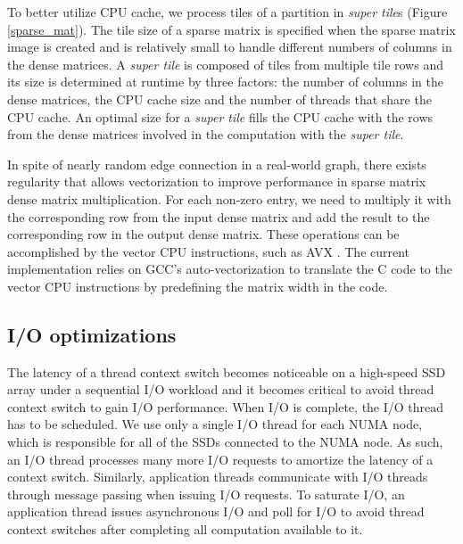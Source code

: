 To better utilize CPU cache, we process tiles of a partition in
\textit{super tile}s (Figure \ref{sparse_mat}). The tile size of a sparse
matrix is specified when the sparse matrix image is created and is relatively
small to handle different numbers of columns in the dense matrices.
A \textit{super tile} is composed of tiles from multiple tile rows and its
size is determined at runtime by three factors: the number of columns
in the dense matrices, the CPU cache size and the number of threads that
share the CPU cache. An optimal size for a \textit{super tile} fills
the CPU cache with the rows from the dense matrices involved in
the computation with the \textit{super tile}.

In spite of nearly random edge connection in a real-world graph,
there exists regularity  that allows vectorization to improve performance
in sparse matrix dense matrix multiplication. For each non-zero entry, we
need to multiply it with the corresponding row from the input dense matrix
and add the result to the corresponding row in the output dense matrix.
These operations can be accomplished by the vector CPU instructions, such as
AVX \cite{avx}. The current implementation relies on GCC's auto-vectorization
to translate the C code to the vector CPU instructions by predefining the matrix
width in the code.

\subsection{I/O optimizations}
The latency of a thread context switch becomes noticeable on a high-speed SSD
array under a sequential I/O workload and it becomes critical to avoid thread
context switch to gain I/O performance. When I/O is complete, the I/O thread
 has to be scheduled. We use only a single I/O
thread for each NUMA node, which is responsible for all of the SSDs connected
to the NUMA node. As such, an I/O
thread processes many more I/O requests to amortize the latency of a context
switch. Similarly, application threads communicate with I/O threads through
message passing when issuing I/O requests. To saturate I/O,
an application thread issues asynchronous I/O and poll for I/O to avoid thread
context switches after completing all computation available to it.

